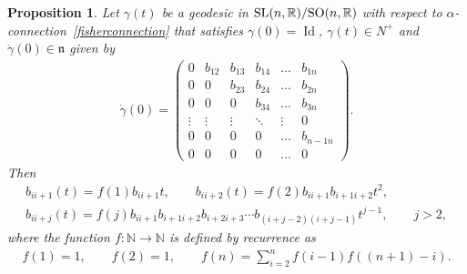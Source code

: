\documentclass[pdftex]{sigma}
\numberwithin{equation}{section}
\newtheorem{Proposition}[Theorem]{Proposition}
{ \theoremstyle{definition}
\newtheorem{Definition}[Theorem]{Definition}
\newtheorem{Example}[Theorem]{Example}
\newtheorem{Remark}[Theorem]{Remark}}
\begin{document}
\begin{Proposition}\label{geodesicN}
Let $\gamma(t)$ be a geodesic in ${\rm SL}(n,{\mathbb R})/{\rm SO}(n,{\mathbb R})$ with respect to $\alpha$-connec\-tion~\eqref{fisherconnection} that satisfies $\gamma(0) = \operatorname{Id}$,
$\gamma(t) \in N^+$ and $\dot{\gamma}(0) \in \mathfrak{n}$ given by
  \begin{gather*}
    \dot{\gamma}(0) =
    \left(
    \begin{matrix}
      0      & b_{12} & b_{13} & b_{14} &\ldots & b_{1n} \\
      0      &   0    & b_{23} & b_{24} &\ldots & b_{2n} \\
      0      &   0    &   0    & b_{34} &\ldots & b_{3n} \\
      \vdots & \vdots & \vdots & \ddots &\vdots &  0   \\
      0      &   0    &   0    & 0      &\ldots & b_{n-1n} \\
      0      &   0    &   0    & 0      &\ldots & 0
    \end{matrix}
    \right).
  \end{gather*}
  Then
  \begin{gather*}
    b_{ii+1}(t)   =   f(1)b_{ii+1}t,\qquad
    b_{ii+2}(t)   =   f(2)b_{ii+1}b_{i+1i+2}t^2,\\
    b_{ii+j}(t)   =   f(j)b_{ii+1}b_{i+1i+2}b_{i+2i+3}\cdots b_{(i+j-2)(i+j-1)}t^{j-1}, \qquad j>2,
  \end{gather*}
  where the function $f\colon \mathbb{N} \rightarrow \mathbb{N}$ is defined by recurrence as
  \begin{gather*}
    f(1)   =   1, \qquad
    f(2)   =   1, \qquad
    f(n)   =   \sum_{i=2}^{n} f(i-1)f((n+1)-i).
  \end{gather*}
\end{Proposition}
\end{document}
